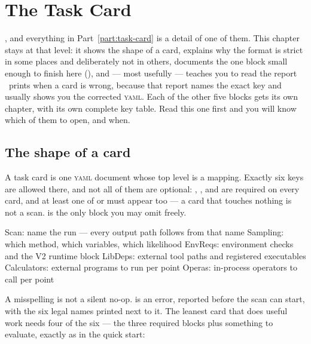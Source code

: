 \chapter{The Task Card}
\label{ch:task-yaml}

, and
everything in Part~\ref{part:task-card} is a detail of one of them. This chapter stays at
that level: it shows the shape of a card, explains why the format is strict in some places
and deliberately not in others, documents the one block small enough to finish here
(), and --- most usefully --- teaches you to read the report \Jtwo\ prints
when a card is wrong, because that report names the exact key and usually shows you the
corrected \textsc{yaml}. Each of the other five blocks gets its own chapter, with its own
complete key table. Read this one first and you will know which of them to open, and when.

\section{The shape of a card}
\label{sec:card-shape}

A task card is one \textsc{yaml} document whose top level is a mapping. Exactly six keys
are allowed there, and not all of them are optional: , ,
and  are required on every card, and at least one of
 or  must appear too --- a card that touches
nothing is not a scan.  is the only block you may omit freely.

\begin{terminal}
\begin{jout}
Scan:         name the run --- every output path follows from that name
Sampling:     which method, which variables, which likelihood
EnvReqs:      environment checks and the V2 runtime block
LibDeps:      external tool paths and registered executables
Calculators:  external programs to run per point
Operas:       in-process operators to call per point
\end{jout}
\end{terminal}

A misspelling is not a silent no-op.  is an error, reported before the
scan can start, with the six legal names printed next to it. The leanest card that does
useful work needs four of the six --- the three required blocks plus something to
evaluate, exactly as in the quick start:

